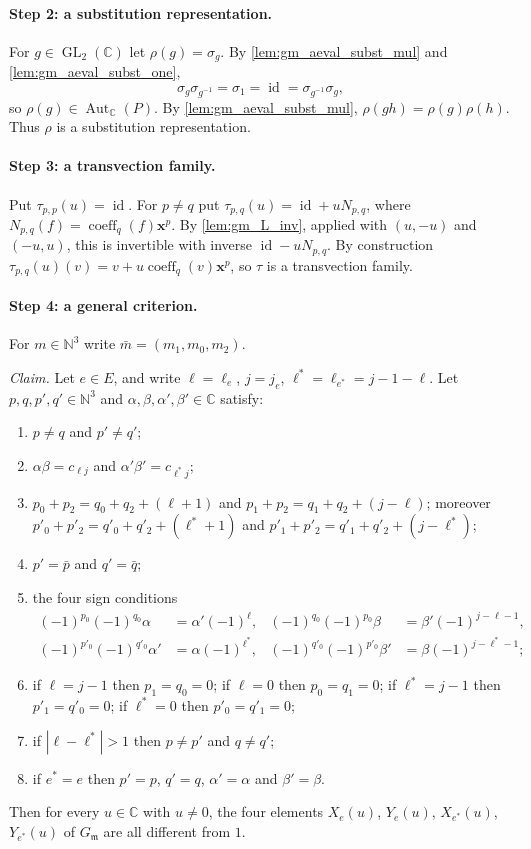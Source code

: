 \documentclass[11pt]{article}
\theoremstyle{definition}
\theoremstyle{remark}
\newcommand{\CC}{\mathbb{C}}
\newcommand{\NN}{\mathbb{N}}
\DeclareMathOperator{\GL}{GL}
\DeclareMathOperator{\Aut}{Aut}
\DeclareMathOperator{\coeff}{coeff}
\DeclareMathOperator{\id}{id}
\begin{document}
\paragraph{Step 2: a substitution representation.}
For $g\in\GL_2(\CC)$ let $\rho(g)=\sigma_g$. By \cref{lem:gm_aeval_subst_mul} and \cref{lem:gm_aeval_subst_one},
\[
\sigma_g\sigma_{g^{-1}}=\sigma_1=\id=\sigma_{g^{-1}}\sigma_g,
\]
so $\rho(g)\in\Aut_\CC(P)$. By \cref{lem:gm_aeval_subst_mul}, $\rho(gh)=\rho(g)\rho(h)$. Thus $\rho$ is a substitution representation.

\paragraph{Step 3: a transvection family.}
Put $\tau_{p,p}(u)=\id$. For $p\neq q$ put $\tau_{p,q}(u)=\id+uN_{p,q}$, where $N_{p,q}(f)=\coeff_q(f)\mathbf x^p$. By \cref{lem:gm_L_inv}, applied with $(u,-u)$ and $(-u,u)$, this is invertible with inverse $\id-uN_{p,q}$. By construction $\tau_{p,q}(u)(v)=v+u\coeff_q(v)\mathbf x^p$, so $\tau$ is a transvection family.

\paragraph{Step 4: a general criterion.}
For $m\in\NN^3$ write $\bar m=(m_1,m_0,m_2)$.

\emph{Claim.} Let $e\in E$, and write $\ell=\ell_e$, $j=j_e$, $\ell^\ast=\ell_{e^\ast}=j-1-\ell$. Let $p,q,p',q'\in\NN^3$ and $\alpha,\beta,\alpha',\beta'\in\CC$ satisfy:
\begin{enumerate}
\item[(a)] $p\neq q$ and $p'\ne q'$;
\item[(b)] $\alpha\beta=c_{\ell j}$ and $\alpha'\beta'=c_{\ell^\ast j}$;
\item[(c)] $p_0+p_2=q_0+q_2+(\ell+1)$ and $p_1+p_2=q_1+q_2+(j-\ell)$; moreover $p'_0+p'_2=q'_0+q'_2+(\ell^\ast+1)$ and $p'_1+p'_2=q'_1+q'_2+(j-\ell^\ast)$;
\item[(d)] $p'=\bar p$ and $q'=\bar q$;
\item[(e)] the four sign conditions
\begin{align*}
(-1)^{p_0}(-1)^{q_0}\alpha&=\alpha'(-1)^{\ell}, & (-1)^{q_0}(-1)^{p_0}\beta&=\beta'(-1)^{j-\ell-1},\\
(-1)^{p'_0}(-1)^{q'_0}\alpha'&=\alpha(-1)^{\ell^\ast}, & (-1)^{q'_0}(-1)^{p'_0}\beta'&=\beta(-1)^{j-\ell^\ast-1};
\end{align*}
\item[(f)] if $\ell=j-1$ then $p_1=q_0=0$; if $\ell=0$ then $p_0=q_1=0$; if $\ell^\ast=j-1$ then $p'_1=q'_0=0$; if $\ell^\ast=0$ then $p'_0=q'_1=0$;
\item[(g)] if $|\ell-\ell^\ast|>1$ then $p\neq p'$ and $q\neq q'$;
\item[(h)] if $e^\ast=e$ then $p'=p$, $q'=q$, $\alpha'=\alpha$ and $\beta'=\beta$.
\end{enumerate}
Then for every $u\in\CC$ with $u\neq0$, the four elements $X_e(u)$, $Y_e(u)$, $X_{e^\ast}(u)$, $Y_{e^\ast}(u)$ of $G_{\mathfrak m}$ are all different from $1$.
\end{document}
